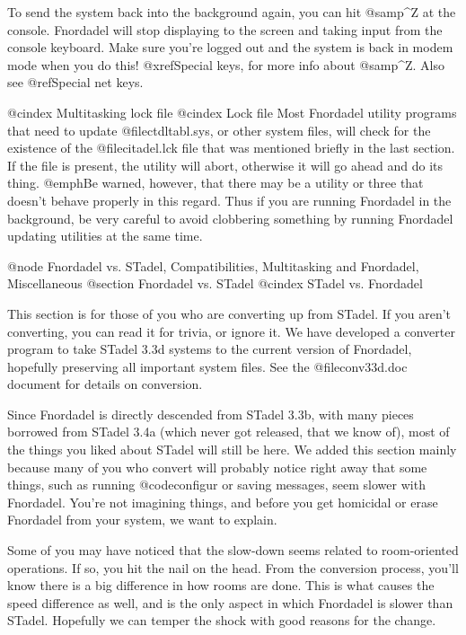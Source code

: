 {{{To send the system back into the background again, you can hit @samp{^Z}
at the console.  Fnordadel will stop displaying to the screen and taking
input from the console keyboard.  Make sure you're logged out and the
system is back in modem mode when you do this!  @xref{Special keys}, for
more info about @samp{^Z}.  Also see @ref{Special net keys}.

@cindex Multitasking lock file
@cindex Lock file
Most Fnordadel utility programs that need to update @file{ctdltabl.sys}, or
other system files, will check for the existence of the @file{citadel.lck}
file that was mentioned briefly in the last section.  If the file is present,
the utility will abort, otherwise it will go ahead and do its thing.
@emph{Be warned}, however, that there may be a utility or three that doesn't
behave properly in this regard.  Thus if you are running Fnordadel in the
background, be very careful to avoid clobbering something by running Fnordadel
updating utilities at the same time.

@node Fnordadel vs. STadel, Compatibilities, Multitasking and Fnordadel, Miscellaneous
@section Fnordadel vs. STadel
@cindex STadel vs. Fnordadel

This section is for those of you who are converting up from STadel.
If you aren't converting, you can read it for trivia, or ignore it.  We have
developed a converter program to take STadel 3.3d systems to the current
version of Fnordadel, hopefully preserving all important system files.  See
the @file{conv33d.doc} document for details on conversion.

Since Fnordadel is directly descended from STadel 3.3b, with many
pieces borrowed from STadel 3.4a (which never got released, that we know of),
most of the things you liked about STadel will still be here.  We added this
section mainly because many of you who convert will probably notice right
away that some things, such as running @code{configur} or saving messages, seem
slower with Fnordadel.  You're not imagining things, and before you get
homicidal or erase Fnordadel from your system, we want to explain.

Some of you may have noticed that the slow-down seems related to room-oriented
operations.  If so, you hit the nail on the head.  From the conversion
process, you'll know there is a big difference in how rooms are done.  This is
what causes the speed difference as well, and is the only aspect in which
Fnordadel is slower than STadel.  Hopefully we can temper the shock with
good reasons for the change.

}}}
